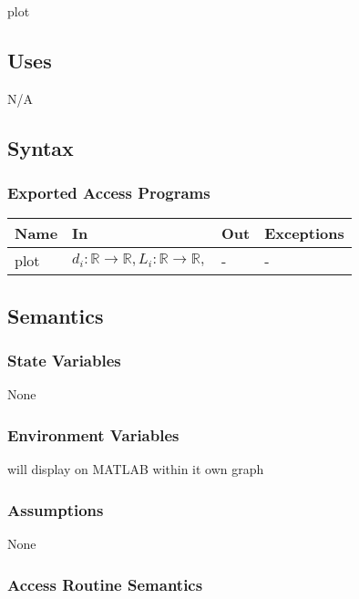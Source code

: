 \documentclass[12pt, titlepage]{article}
\begin{document}
plot

\subsection{Uses}

N/A

\subsection{Syntax}

\subsubsection{Exported Access Programs}

\begin{center}
\begin{tabular}{p{2cm} p{8cm} p{2cm} p{2cm}}
\hline
\textbf{Name} & \textbf{In} & \textbf{Out} & \textbf{Exceptions} \\
\hline
plot & $d_i:\mathbb{R} \rightarrow \mathbb{R},
                 L_i:\mathbb{R} \rightarrow \mathbb{R},
                 $ & - & - \\
\hline
\end{tabular}
\end{center}

\subsection{Semantics}

\subsubsection{State Variables}

None

\subsubsection{Environment Variables}

will display on MATLAB within it own graph\\

\subsubsection{Assumptions}

None

\subsubsection{Access Routine Semantics}
\end{document}
